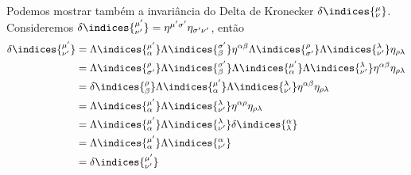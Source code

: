 Podemos mostrar também a invariância do Delta de Kronecker \(\delta\indices{^\mu_\nu}\). Consideremos \(\delta\indices{^{\mu'}_{\nu'}} = \eta^{\mu'\sigma'}\eta_{\sigma'\nu'}\), então
\begin{align*}
    \delta\indices{^{\mu'}_{\nu'}} &= \Lambda\indices{^{\mu'}_{\alpha}}\Lambda\indices{^{\sigma'}_{\beta}} \eta^{\alpha\beta} \Lambda\indices{^{\rho}_{\sigma'}}\Lambda\indices{^\lambda_{\nu'}}\eta_{\rho\lambda}\\
                                   &= \Lambda\indices{^\rho_{\sigma'}}\Lambda\indices{^{\sigma'}_{\beta}} \Lambda\indices{^{\mu'}_{\alpha}} \Lambda\indices{^\lambda_{\nu'}} \eta^{\alpha \beta} \eta_{\rho \lambda}\\
                                   &= \delta\indices{^\rho_\beta} \Lambda\indices{^{\mu'}_{\alpha}}\Lambda\indices{^\lambda_{\nu'}}\eta^{\alpha \beta}\eta_{\rho \lambda}\\
                                   &= \Lambda\indices{^{\mu'}_{\alpha}}\Lambda\indices{^\lambda_{\nu'}}\eta^{\alpha \rho}\eta_{\rho \lambda}\\
                                   &= \Lambda\indices{^{\mu'}_{\alpha}}\Lambda\indices{^\lambda_{\nu'}} \delta\indices{^\alpha_{\lambda}}\\
                                   &= \Lambda\indices{^{\mu'}_{\alpha}}\Lambda\indices{^\alpha_{\nu'}}\\
                                   &= \delta\indices{^{\mu'}_{\nu'}}
\end{align*}
